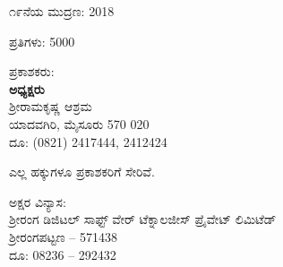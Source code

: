 \thispagestyle{empty}

\vfill

\begin{flushleft}
೧೯ನೆಯ ಮುದ್ರಣ: 2018
\end{flushleft}

\vfill

\begin{flushleft}
ಪ್ರತಿಗಳು: 5000
\end{flushleft}

\vfill


\vfill

\begin{flushleft}
ಪ್ರಕಾಶಕರು:\\\textbf{ಅಧ್ಯಕ್ಷರು}\\ಶ‍್ರೀರಾಮಕೃಷ್ಣ ಆಶ್ರಮ\\ಯಾದವಗಿರಿ, ಮೈಸೂರು 570 020\\ದೂ: (0821) 2417444, 2412424
\end{flushleft}

\vfill

\begin{flushleft}
 ಎಲ್ಲ ಹಕ್ಕುಗಳೂ ಪ್ರಕಾಶಕರಿಗೆ ಸೇರಿವೆ. 
\end{flushleft}

\vfill

\begin{flushleft}{\small
ಅಕ್ಷರ ವಿನ್ಯಾಸ:\\ಶ‍್ರೀರಂಗ ಡಿಜಿಟಲ್ ಸಾಫ್ಟ್ ‍ವೇರ್ ಟೆಕ್ನಾಲಜೀಸ್ ಪ್ರೈವೇಟ್ ಲಿಮಿಟೆಡ್\\ಶ‍್ರೀರಂಗಪಟ್ಟಣ – 571438\\ದೂ: 08236 – 292432
}\end{flushleft}

\vfill


